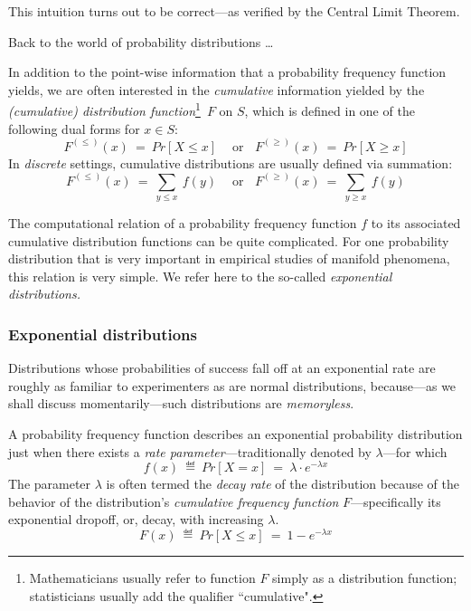 \smallskip

\noindent
This intuition turns out to be correct---as verified by the Central Limit Theorem.

\medskip

\noindent Back to the world of probability distributions \ldots

\bigskip

 

In addition to the point-wise information that a probability frequency function yields, we are
often interested in the {\em cumulative} information yielded by the 
{\it (cumulative) distribution function}\footnote{Mathematicians usually refer to function $F$
simply as a distribution function; statisticians usually add the qualifier ``cumulative".}~$F$ 
on $S$, which is defined in one of the following dual forms for $x \in S$:
\[ F^{(\leq)}(x) \ = \ Pr[X \leq x] \ \ \ \ \mbox{ or} \ \ \ \  F^{(\geq)}(x) \ = \ Pr[X \geq x]\]
In {\em discrete} settings, cumulative distributions are usually defined via summation:
\[ F^{(\leq)}(x) \ = \ \sum_{y \leq x} \ f(y)  \ \ \ \ \mbox{ or} \ \ \ \ F^{(\geq)}(x) \ = \ \sum_{y \geq x} \ f(y) \]


The computational relation of a probability frequency function $f$ to its associated cumulative distribution functions can be quite complicated.  For one probability distribution that is very important in empirical studies of manifold phenomena, this relation is very simple.  We refer here to the so-called {\em exponential distributions.}



\subsubsection{Exponential distributions} 
\label{sec:exponential-distr}

Distributions whose probabilities of success fall off at an exponential rate are roughly as familiar to experimenters as are normal distributions, because---as we shall discuss momentarily---such distributions are {\em memoryless}.

A probability frequency function describes an exponential probability distribution just when there exists a {\em rate parameter}---traditionally denoted by $\lambda$---for which
\[ f(x) \ \eqdef \ Pr[X=x] \ = \ \lambda \cdot e^{-\lambda x} \]
The parameter $\lambda$ is often termed the {\em decay rate} of the distribution because of the behavior of the distribution's {\em cumulative frequency function} $F$---specifically its exponential dropoff, or, decay, with increasing $\lambda$.
\[ F(x) \ \eqdef \ Pr[X \leq x] \ = \ 1 - e^{-\lambda x} \]

